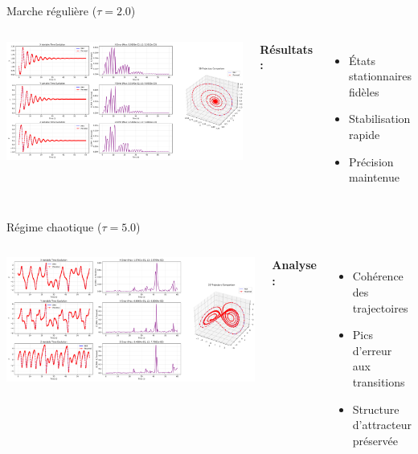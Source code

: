 \begin{frame}{Marche régulière ($\tau = 2.0$)}
    \begin{columns}
        \includegraphics[width=\textwidth]{../Document/figures/comparisons/comparison_tau2.0_comparison}
        
        \textbf{Résultats :}
        \begin{itemize}
            \item États stationnaires fidèles
            \item Stabilisation rapide
            \item Précision maintenue
        \end{itemize}
    \end{columns}
\end{frame}

\begin{frame}{Régime chaotique ($\tau = 5.0$)}
    \begin{columns}
        \includegraphics[width=\textwidth]{../Document/figures/comparisons/comparison_tau5.0_comparison}
        
        \textbf{Analyse :}
        \begin{itemize}
            \item Cohérence des trajectoires
            \item Pics d'erreur aux transitions
            \item Structure d'attracteur préservée
        \end{itemize}
    \end{columns}
\end{frame}

